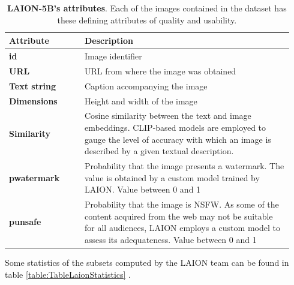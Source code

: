 \begin{table}[ht]
\centering
\begin{tabular}{|p{0.25\linewidth} | p{0.69\linewidth}|}
\hline
\rowcolor[HTML]{AEAAAA} 
{\textbf{Attribute}} & {\textbf{Description}} \\ \hline
\textbf{id} & Image identifier \\ \hline
\textbf{URL} & URL from where the image was obtained \\ \hline
\textbf{Text string} & Caption accompanying the image \\ \hline
\textbf{Dimensions} & Height and width of the image \\ \hline
\textbf{Similarity} & Cosine similarity between the text and image embeddings. CLIP-based   models are employed to gauge the level of accuracy with which an image is   described by a given textual description.\\ \hline
\textbf{pwatermark} & Probability that the image presents a watermark. The value is   obtained by a custom model trained by LAION. Value between 0 and 1 \\ \hline
\textbf{punsafe} & Probability that the image is NSFW. As some of the content   acquired from the web may not be suitable for all audiences, LAION employs a   custom model to assess its adequateness. Value between 0 and 1 \\ \hline
\end{tabular}
\caption{\textbf{LAION-5B’s attributes}. Each of the images contained in the dataset has these defining attributes of quality and usability.}
\label{table:TableLaionAttributes}
\end{table}

Some statistics of the subsets computed by the LAION team can be found in table \ref{table:TableLaionStatistics} \cite{schuhmann2022laion}.

